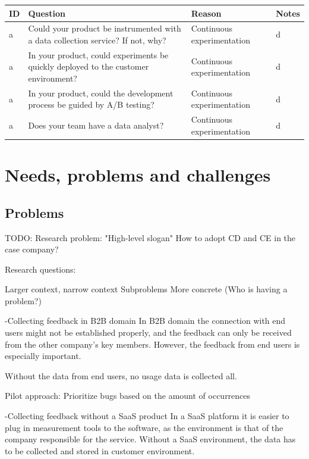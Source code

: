 \documentclass[english]{tktltiki2}
\theoremstyle{definition}
\theoremstyle{remark}
\begin{document}
\begin{center}
    \begin{tabular}{ | l | l | l | p{5cm} |}
    \hline
    ID & Question & Reason & Notes \\ \hline
    a & Could your product be instrumented with a data collection service? If not, why? & Continuous experimentation & d \\ \hline
    a & In your product, could experiments be quickly deployed to the customer environment? & Continuous experimentation & d \\ \hline
    a & In your product, could the development process be guided by A/B testing? & Continuous experimentation & d \\ \hline
    a & Does your team have a data analyst? & Continuous experimentation & d \\ \hline
    \hline
    \end{tabular}
\end{center}

\section{Needs, problems and challenges}

\subsection{Problems} %

TODO:
Research problem: "High-level slogan"
How to adopt CD and CE in the case company?

Research questions:

Larger context, narrow context
Subproblems
More concrete (Who is having a problem?)

-Collecting feedback in B2B domain
  In B2B domain the connection with end users might not be established properly, and the feedback can only be received from the other company's key members. However, the feedback from end users is especially important. 

  Without the data from end users, no usage data is collected all. 

  Pilot approach: Prioritize bugs based on the amount of occurrences

-Collecting feedback without a SaaS product
  In a SaaS platform it is easier to plug in measurement tools to the software, as the environment is that of the company responsible for the service. Without a SaaS environment, the data has to be collected and stored in customer environment. 
\end{document}
